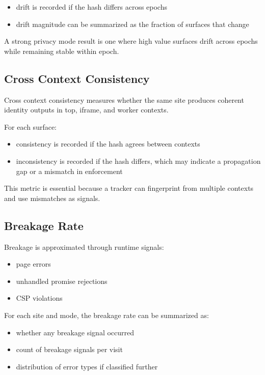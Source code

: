 \documentclass[11pt]{report}
\begin{document}
\begin{itemize}
    \item drift is recorded if the hash differs across epochs
    \item drift magnitude can be summarized as the fraction of surfaces that change
\end{itemize}

A strong privacy mode result is one where high value surfaces drift across epochs while remaining stable within epoch.

\subsection{Cross Context Consistency}

Cross context consistency measures whether the same site produces coherent identity outputs in top, iframe, and worker contexts.

For each surface:

\begin{itemize}
    \item consistency is recorded if the hash agrees between contexts
    \item inconsistency is recorded if the hash differs, which may indicate a propagation gap or a mismatch in enforcement
\end{itemize}

This metric is essential because a tracker can fingerprint from multiple contexts and use mismatches as signals.

\subsection{Breakage Rate}

Breakage is approximated through runtime signals:

\begin{itemize}
    \item page errors
    \item unhandled promise rejections
    \item CSP violations
\end{itemize}

For each site and mode, the breakage rate can be summarized as:

\begin{itemize}
    \item whether any breakage signal occurred
    \item count of breakage signals per visit
    \item distribution of error types if classified further
\end{itemize}
\end{document}
